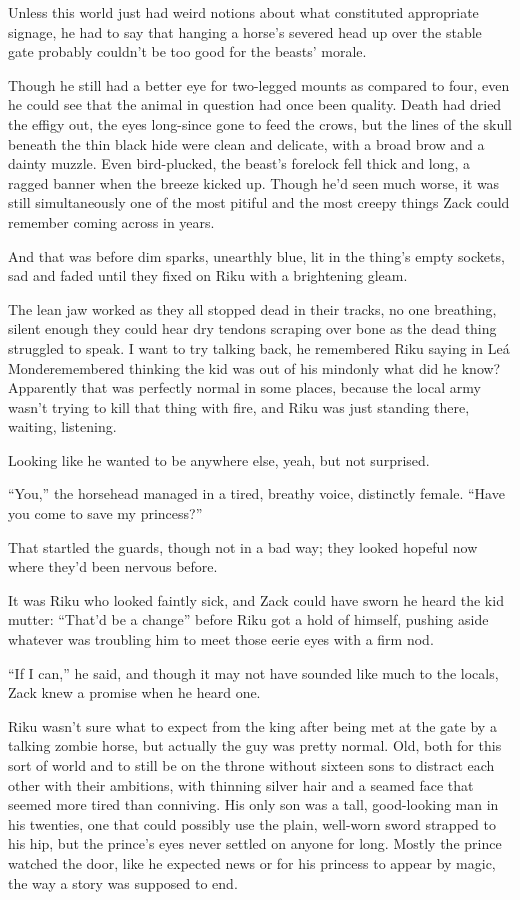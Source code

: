 Unless this world just had weird notions about what constituted appropriate signage, he had to say that hanging a horse's severed head up over the stable gate probably couldn't be too good for the beasts' morale.

Though he still had a better eye for two-legged mounts as compared to four, even he could see that the animal in question had once been quality. Death had dried the effigy out, the eyes long-since gone to feed the crows, but the lines of the skull beneath the thin black hide were clean and delicate, with a broad brow and a dainty muzzle. Even bird-plucked, the beast's forelock fell thick and long, a ragged banner when the breeze kicked up. Though he'd seen much worse, it was still simultaneously one of the most pitiful and the most creepy things Zack could remember coming across in years.

And that was before dim sparks, unearthly blue, lit in the thing's empty sockets, sad and faded until they fixed on Riku with a brightening gleam.

The lean jaw worked as they all stopped dead in their tracks, no one breathing, silent enough they could hear dry tendons scraping over bone as the dead thing struggled to speak. I want to try talking back, he remembered Riku saying in Leá Monde\textemdash remembered thinking the kid was out of his mind\textemdash only what did he know? Apparently that was perfectly normal in some places, because the local army wasn't trying to kill that thing with fire, and Riku was just standing there, waiting, listening.

Looking like he wanted to be anywhere else, yeah, but not surprised.

``You,'' the horsehead managed in a tired, breathy voice, distinctly female. ``Have you come to save my princess?''

That startled the guards, though not in a bad way; they looked hopeful now where they'd been nervous before.

It was Riku who looked faintly sick, and Zack could have sworn he heard the kid mutter: ``That'd be a change'' before Riku got a hold of himself, pushing aside whatever was troubling him to meet those eerie eyes with a firm nod.

``If I can,'' he said, and though it may not have sounded like much to the locals, Zack knew a promise when he heard one.


\scenechange


Riku wasn't sure what to expect from the king after being met at the gate by a talking zombie horse, but actually the guy was pretty normal. Old, both for this sort of world and to still be on the throne without sixteen sons to distract each other with their ambitions, with thinning silver hair and a seamed face that seemed more tired than conniving. His only son was a tall, good-looking man in his twenties, one that could possibly use the plain, well-worn sword strapped to his hip, but the prince's eyes never settled on anyone for long. Mostly the prince watched the door, like he expected news or for his princess to appear by magic, the way a story was supposed to end.

